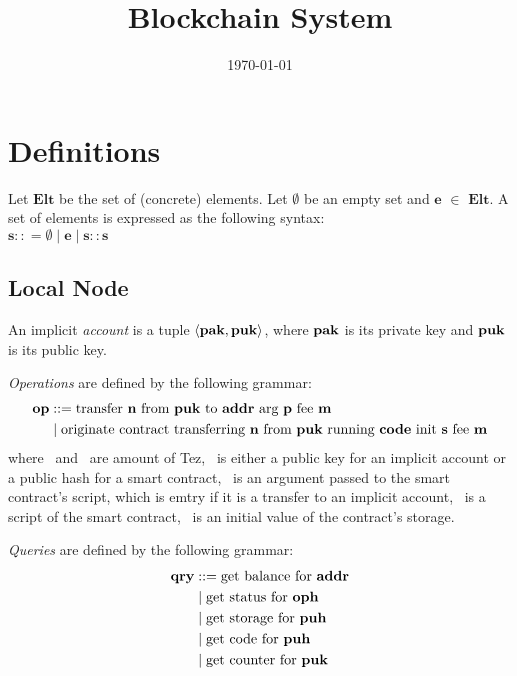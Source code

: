 \documentclass[a4paper]{llncs}
\title{Blockchain System}
\author{}
\institute{}
\date{\today}
\begin{document}
\maketitle
\pagestyle{plain}

\section{Definitions}
\begin{definition}%
Let $\mathbf{Elt}$ be the set of (concrete) elements. Let $\emptyset$ be an empty set and $\mathbf{e}$ $\in$  $\mathbf{Elt}$. A set of elements is expressed as the following syntax:
\\
$\mathbf{s} :: = \emptyset \mid \mathbf{e} \mid \mathbf{s :: s}$
\end{definition}

\subsection{Local Node}
\label{sec:local-node}


\begin{definition}%
  An implicit \emph{account} is a tuple $\langle
  \PAK, \PUK
  \rangle $, where
  $\PAK$ is its private key and $\PUK$ is its public key.
\end{definition}


\begin{definition}%
  \emph{Operations} are defined by the following grammar:
  \begin{align*}
    \OP &::= \TRANSFER[\PARAMETER]\NTEZ\PUK\ADDR\MTEZ
    \\&\mid \ORIGINATE\NTEZ\PUK\CODE\INIT\MTEZ
  \end{align*}
  where \NTEZ\ and \MTEZ\ are amount of Tez, \ADDR\ is either a public key for an implicit account  or a public hash for a smart contract,  \PARAMETER\ is an argument passed to the smart contract's script, which is emtry if it is a transfer to an implicit account, \CODE\ is a script of the smart contract, \INIT\ is an initial value of the contract's storage.
\end{definition}

\begin{definition}%
\emph{Queries} are defined by the following grammar:
\begin{align*}
  \QRY & ::= \GETBALANCE\ADDR
  \\&\mid \GETSTATUS\OPH
  \\&\mid \GETSTORAGE\PUH
  \\&\mid \GETCODE\PUH 
  \\&\mid \GETCOUNTER\PUK
\end{align*}
\end{definition}
\end{document}
